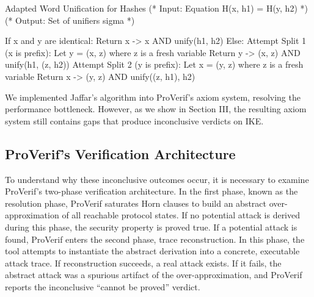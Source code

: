 \documentclass[journal]{IEEEtran}
\begin{document}
\begin{proverifcode}{Adapted Word Unification for Hashes}
(* Input: Equation H(x, h1) = H(y, h2) *)
(* Output: Set of unifiers {sigma} *)

If x and y are identical:
  Return { x -> x } AND unify(h1, h2)
Else:
  Attempt Split 1 (x is prefix):
    Let y = (x, z) where z is a fresh variable
    Return { y -> (x, z) } AND unify(h1, (z, h2))
  Attempt Split 2 (y is prefix):
    Let x = (y, z) where z is a fresh variable
    Return { x -> (y, z) } AND unify((z, h1), h2)
\end{proverifcode}

We implemented Jaffar's algorithm into ProVerif's axiom system, resolving the performance bottleneck. However, as we show in Section III, the resulting axiom system still contains gaps that produce inconclusive verdicts on IKE.

\subsection{ProVerif's Verification Architecture}
To understand why these inconclusive outcomes occur, it is necessary to examine ProVerif's two-phase verification architecture.  In the first phase, known as the resolution phase, ProVerif saturates Horn clauses to build an abstract over-approximation of all reachable protocol states. If no potential attack is derived during this phase, the security property is proved true. If a potential attack is found, ProVerif enters the second phase, trace reconstruction. In this phase, the tool attempts to instantiate the abstract derivation into a concrete, executable attack trace. If reconstruction succeeds, a real attack exists. If it fails, the abstract attack was a spurious artifact of the over-approximation, and ProVerif reports the inconclusive ``cannot be proved'' verdict.
\end{document}
